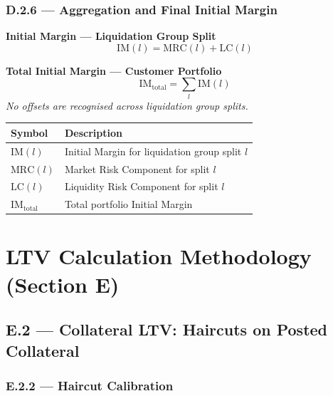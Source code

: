 \documentclass[9pt, a4paper]{extarticle}
\newenvironment{formulabox}{\par\addvspace{4pt}}{\par\addvspace{4pt}}
\newcommand{\vartableheader}{%
    \textbf{Symbol} & \textbf{Description}\\
}
\begin{document}
\subsubsection{D.2.6 — Aggregation and Final Initial Margin}

\begin{formulabox}
\textbf{Initial Margin — Liquidation Group Split}
\begin{equation*}
    \mathrm{IM}(l) = \mathrm{MRC}(l) + \mathrm{LC}(l)
\end{equation*}
\end{formulabox}

\begin{formulabox}
\textbf{Total Initial Margin — Customer Portfolio}
\begin{equation*}
    \mathrm{IM}_{\mathrm{total}} = \sum_{l} \mathrm{IM}(l)
\end{equation*}
\textit{No offsets are recognised across liquidation group splits.}
\end{formulabox}

\begin{tabularx}{\linewidth}{lX}
\toprule
\vartableheader
\midrule
$\mathrm{IM}(l)$               & Initial Margin for liquidation group split $l$ \\
$\mathrm{MRC}(l)$              & Market Risk Component for split $l$ \\
$\mathrm{LC}(l)$               & Liquidity Risk Component for split $l$ \\
$\mathrm{IM}_{\mathrm{total}}$ & Total portfolio Initial Margin \\
\bottomrule
\end{tabularx}

\newpage

\section{LTV Calculation Methodology (Section E)}
\label{sec:ltv}

\subsection{E.2 — Collateral LTV: Haircuts on Posted Collateral}

\subsubsection{E.2.2 — Haircut Calibration}
\end{document}
